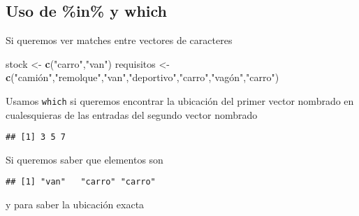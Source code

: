 \documentclass[]{article}
\newenvironment{Shaded}{\begin{snugshade}}{\end{snugshade}}
\newcommand{\KeywordTok}[1]{\textcolor[rgb]{0.13,0.29,0.53}{\textbf{#1}}}
\newcommand{\StringTok}[1]{\textcolor[rgb]{0.31,0.60,0.02}{#1}}
\newcommand{\OperatorTok}[1]{\textcolor[rgb]{0.81,0.36,0.00}{\textbf{#1}}}
\newcommand{\NormalTok}[1]{#1}
\begin{document}
\subsection{Uso de \%in\% y which}\label{uso-de-in-y-which}

Si queremos ver matches entre vectores de caracteres

\begin{Shaded}
\begin{Highlighting}[]
\NormalTok{stock <-}\StringTok{ }\KeywordTok{c}\NormalTok{(}\StringTok{"carro"}\NormalTok{,}\StringTok{"van"}\NormalTok{)}
\NormalTok{requisitos <-}\StringTok{ }\KeywordTok{c}\NormalTok{(}\StringTok{"camión","}\NormalTok{remolque}\StringTok{","}\NormalTok{van}\StringTok{","}\NormalTok{deportivo}\StringTok{","}\NormalTok{carro}\StringTok{","}\NormalTok{vagón",}\StringTok{"carro"}\NormalTok{)}
\end{Highlighting}
\end{Shaded}

Usamos \texttt{which} si queremos encontrar la ubicación del primer
vector nombrado en cualesquieras de las entradas del segundo vector
nombrado

\begin{Shaded}
\end{Shaded}

\begin{verbatim}
## [1] 3 5 7
\end{verbatim}

Si queremos saber que elementos son

\begin{Shaded}
\end{Shaded}

\begin{verbatim}
## [1] "van"   "carro" "carro"
\end{verbatim}

y para saber la ubicación exacta

\begin{Shaded}
\end{Shaded}
\end{document}
